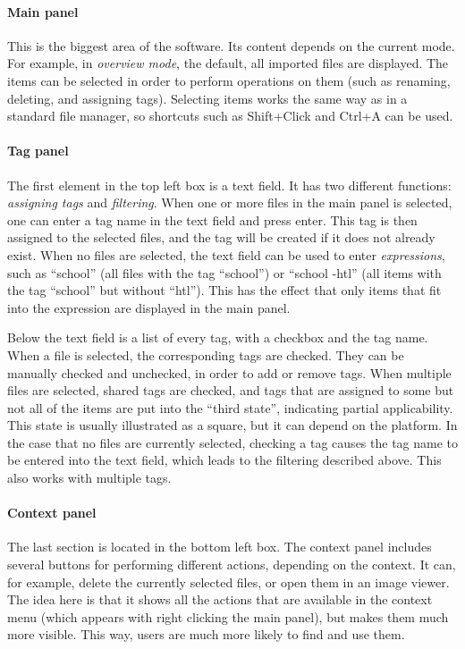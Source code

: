 \paragraph{Main panel} This is the biggest area of the software. Its content
depends on the current mode. For example, in \textit{overview mode}, the
default, all imported files are displayed. The items can be selected in order
to perform operations on them (such as renaming, deleting, and assigning tags).
Selecting items works the same way as in a standard file manager, so shortcuts
such as Shift+Click and Ctrl+A can be used. %

\paragraph{Tag panel} The first element in the top left box is a text field. It
has two different functions: \textit{assigning tags} and \textit{filtering}.
When one or more files in the main panel is selected, one can enter a tag name
in the text field and press enter. This tag is then assigned to the selected
files, and the tag will be created if it does not already exist. When no files
are selected, the text field can be used to enter \textit{expressions}, such as
``school'' (all files with the tag ``school'') or ``school -htl'' (all items
with the tag ``school'' but without ``htl''). This has the effect that only
items that fit into the expression are displayed in the main panel.

Below the text field is a list of every tag, with a checkbox and the tag name.
When a file is selected, the corresponding tags are checked. They can be
manually checked and unchecked, in order to add or remove tags. When multiple
files are selected, shared tags are checked, and tags that are assigned to some
but not all of the items are put into the ``third state'', indicating partial
applicability. This state is usually illustrated as a square, but it can depend
on the platform. In the case that no files are currently selected, checking a
tag causes the tag name to be entered into the text field, which leads to the
filtering described above. This also works with multiple tags.

\paragraph{Context panel} The last section is located in the bottom left box.
The context panel includes several buttons for performing different actions,
depending on the context. It can, for example, delete the currently selected
files, or open them in an image viewer. The idea here is that it shows all the
actions that are available in the context menu (which appears with right
clicking the main panel), but makes them much more visible. This way, users are
much more likely to find and use them.

